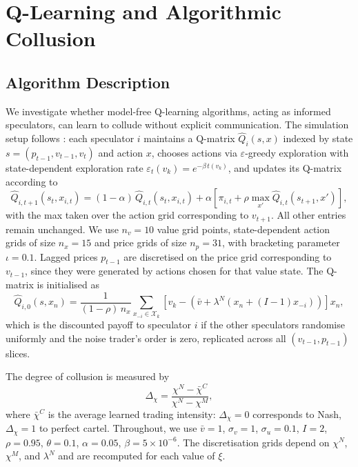 \documentclass[11pt]{article}
\begin{document}
\section{Q-Learning and Algorithmic Collusion}

\subsection{Algorithm Description}

We investigate whether model-free Q-learning algorithms, acting as informed
speculators, can learn to collude without explicit communication. The
simulation setup follows \citet{Dou2025}: each speculator $i$ maintains a
Q-matrix $\hat{Q}_i(s, x)$ indexed by state $s = (p_{t-1}, v_{t-1}, v_t)$
and action $x$, chooses actions via $\varepsilon$-greedy exploration with
state-dependent exploration rate $\varepsilon_t(v_k) = e^{-\beta\, t(v_k)}$,
and updates its Q-matrix according to
\begin{equation}
    \hat{Q}_{i,t+1}(s_t, x_{i,t}) = (1-\alpha)\,\hat{Q}_{i,t}(s_t, x_{i,t}) +
    \alpha\left[\pi_{i,t} + \rho \max_{x'}\hat{Q}_{i,t}(s_{t+1}, x')\right],
    \label{eq:Qupdate}
\end{equation}
with the max taken over the action grid corresponding to $v_{t+1}$. All
other entries remain unchanged. We use $n_v = 10$ value
grid points, state-dependent action grids of size $n_x = 15$ and price
grids of size $n_p = 31$, with bracketing parameter $\iota = 0.1$. Lagged
prices $p_{t-1}$ are discretised on the price grid corresponding to
$v_{t-1}$, since they were generated by actions chosen for that value
state. The Q-matrix is initialised as
\begin{equation}
    \hat{Q}_{i,0}(s, x_n) = \frac{1}{(1-\rho)\,n_x} \sum_{x_{-i} \in \mathcal{X}_k}
    \left[v_k - \left(\bar{v} + \lambda^N(x_n + (I-1)x_{-i})\right)\right] x_n,
    \label{eq:Qinit}
\end{equation}
which is the discounted payoff to speculator $i$ if the other speculators
randomise uniformly and the noise trader's order is zero, replicated
across all $(v_{t-1}, p_{t-1})$ slices.

The degree of collusion is measured by
\begin{equation}
    \Delta_\chi = \frac{\chi^N - \bar{\chi}^C}{\chi^N - \chi^M},
    \label{eq:collusion_index}
\end{equation}
where $\bar{\chi}^C$ is the average learned trading intensity:
$\Delta_\chi = 0$ corresponds to Nash, $\Delta_\chi = 1$ to perfect
cartel. Throughout, we use $\bar{v} = 1$, $\sigma_v = 1$, $\sigma_u = 0.1$,
$I = 2$, $\rho = 0.95$, $\theta = 0.1$, $\alpha = 0.05$,
$\beta = 5 \times 10^{-6}$. The discretisation grids depend on $\chi^N$,
$\chi^M$, and $\lambda^N$ and are recomputed for each value of $\xi$.
\end{document}

